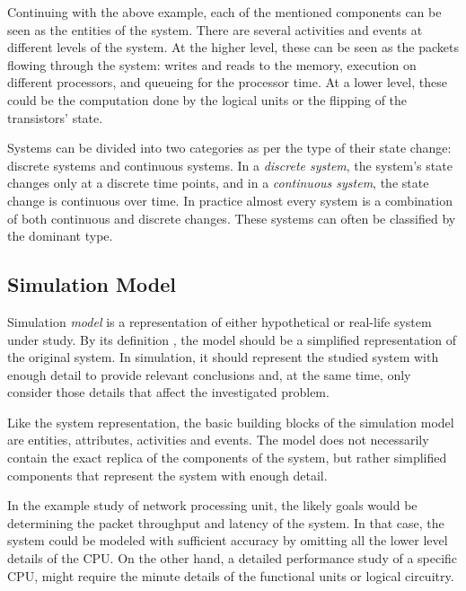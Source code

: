 Continuing with the above example, each of the mentioned components can be seen as the entities of the system. There are several activities and events at different levels of the system. At the higher level, these can be seen as the packets flowing through the system: writes and reads to the memory, execution on different processors, and queueing for the processor time. At a lower level, these could be the computation done by the logical units or the flipping of the transistors' state.

Systems can be divided into two categories as per the type of their state change: discrete systems and continuous systems. In a \emph{discrete system}, the system's state changes only at a discrete time points, and in a \emph{continuous system}, the state change is continuous over time. In practice almost every system is a combination of both continuous and discrete changes. These systems can often be classified by the dominant type. \cite{Banks:2010:DES}

\subsection{Simulation Model}
\label{sec:simulation-model}

Simulation \emph{model} is a representation of either hypothetical or real-life system under study. By its definition \cite{Encyclopedia of computer science}, the model should be a simplified representation of the original system. In simulation, it should represent the studied system with enough detail to provide relevant conclusions and, at the same time, only consider those details that affect the investigated problem. \cite{Banks:2010:DES}

Like the system representation, the basic building blocks of the simulation model are entities, attributes, activities and events. The model does not necessarily contain the exact replica of the components of the system, but rather simplified components that represent the system with enough detail. \cite{Banks:2010:DES}

In the example study of network processing unit, the likely goals would be determining the packet throughput and latency of the system. In that case, the system could be modeled with sufficient accuracy by omitting all the lower level details of the CPU. On the other hand, a detailed performance study of a specific CPU, might require the minute details of the functional units or logical circuitry. \cite{TODO: find some simulation example for this}

